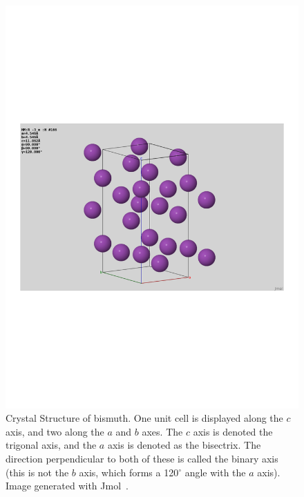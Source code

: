 \documentclass{thesis-umich}
\begin{document}
\begin{figure}
	\centering
	\caption[Crystal Strucure of Bismuth]{Crystal Structure of bismuth. One unit cell is displayed along the $c$ axis, and two along the $a$ and $b$ axes. The $c$ axis is denoted the trigonal axis, and the $a$ axis is denoted as the bisectrix. The direction perpendicular to both of these is called the binary axis (this is not the $b$ axis, which forms a 120$^\circ$ angle with the $a$ axis). Image generated with Jmol~\cite{jmol}.}
	\label{fig:bismuth_crystal}
	\includegraphics[trim={2in 3in 2in 3in},clip]{figures/bismuth_crystal.pdf}
\end{figure}
\end{document}
